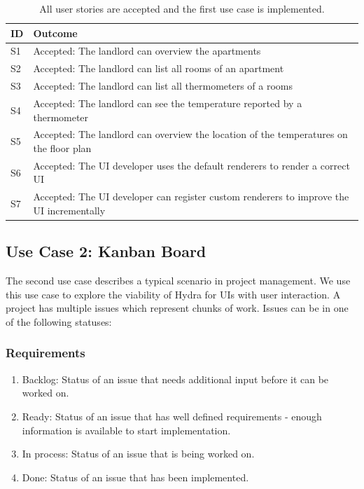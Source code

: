 \begin{table}[!htb]
  \begin{center}
    \begin{tabular}{ |l|l| }
      \hline
      \textbf{ID} & \textbf{Outcome} \\
      \hline
      S1 & Accepted: The landlord can overview the apartments \\
      \hline
      S2 & Accepted: The landlord can list all rooms of an apartment \\
      \hline
      S3 & Accepted: The landlord can list all thermometers of a rooms \\
      \hline
      S4 & Accepted: The landlord can see the temperature reported by a thermometer \\
      \hline
      S5 & Accepted: The landlord can overview the location of the temperatures on the floor plan \\
      \hline
      S6 & Accepted: The UI developer uses the default renderers to render a correct UI \\
      \hline
      S7 & Accepted: The UI developer can register custom renderers to improve the UI incrementally \\
      \hline
    \end{tabular}
    \caption{All user stories are accepted and the first use case is implemented.}
  \end{center}
\end{table}

\subsection{Use Case 2: Kanban Board}
The second use case describes a typical scenario in project management. We use this use case to explore the viability of Hydra for UIs with user interaction. A project has multiple issues which represent chunks of work. Issues can be in one of the following statuses:

\subsubsection{Requirements}

\begin{enumerate}
  \item Backlog: Status of an issue that needs additional input before it can be worked on.
  \item Ready: Status of an issue that has well defined requirements - enough information is available to start implementation.
  \item In process: Status of an issue that is being worked on.
  \item Done: Status of an issue that has been implemented.
\end{enumerate}

